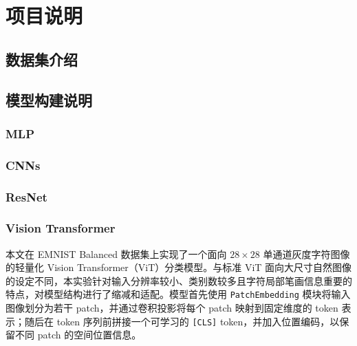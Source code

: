 \documentclass[12pt,hyperref,a4paper,UTF8]{ctexart}
\begin{document}
\cover
\thispagestyle{empty} %
\newpage
\begin{abstract}

\end{abstract}






\section{项目说明}
\subsection{数据集介绍}
\subsection{模型构建说明}
\subsubsection{MLP}


\subsubsection{CNNs}


\subsubsection{ResNet}


\subsubsection{Vision Transformer}

本文在 EMNIST Balanced 数据集上实现了一个面向 $28\times 28$ 单通道灰度字符图像的轻量化 Vision Transformer（ViT）分类模型。与标准 ViT 面向大尺寸自然图像的设定不同，本实验针对输入分辨率较小、类别数较多且字符局部笔画信息重要的特点，对模型结构进行了缩减和适配。模型首先使用 \texttt{PatchEmbedding} 模块将输入图像划分为若干 patch，并通过卷积投影将每个 patch 映射到固定维度的 token 表示；随后在 token 序列前拼接一个可学习的 \texttt{[CLS]} token，并加入位置编码，以保留不同 patch 的空间位置信息。
\end{document}
